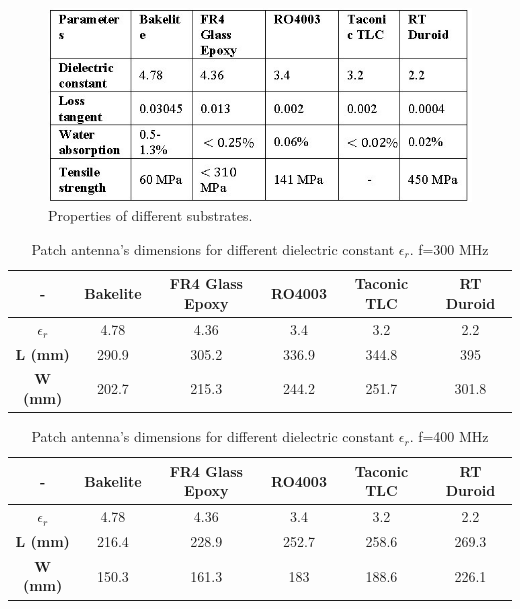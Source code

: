 \begin{figure}[ht]
\centering
\includegraphics[width=.75\textwidth]{figures/Yannis/substrate.jpg}
\caption{Properties of different substrates. \cite{substrates}}
\label{substrate}
\end{figure}

\begin{table}[ht]
\centering
\begin{tabular}[width=.75\textwidth]{| c | c | c | c | c | c |}
\hline
 - & \textbf{Bakelite} & \textbf{FR4 Glass Epoxy} & \textbf{RO4003} & \textbf{Taconic TLC} & \textbf{RT Duroid} \\ 
 \hline
 \textbf{$\epsilon_{r}$} & 4.78 & 4.36 & 3.4 & 3.2 & 2.2 \\  
 \hline
 \textbf{L (mm)} & 290.9 & 305.2 & 336.9 & 344.8 & 395 \\
 \hline
 \textbf{W (mm)} & 202.7 & 215.3 & 244.2 & 251.7 & 301.8 \\
 \hline
\end{tabular}
\caption{Patch antenna's dimensions for different dielectric constant $\epsilon_{r}$. f=300 MHz}
\label{table: subs300}
\end{table}

\begin{table}[ht]
\centering
\begin{tabular}[width=.75\textwidth]{| c | c | c | c | c | c |}
\hline
 - & \textbf{Bakelite} & \textbf{FR4 Glass Epoxy} & \textbf{RO4003} & \textbf{Taconic TLC} & \textbf{RT Duroid} \\ 
 \hline
 \textbf{$\epsilon_{r}$} & 4.78 & 4.36 & 3.4 & 3.2 & 2.2 \\  
 \hline
 \textbf{L (mm)} & 216.4 & 228.9 & 252.7 & 258.6 & 269.3 \\
 \hline
 \textbf{W (mm)} & 150.3 & 161.3 & 183 & 188.6 & 226.1 \\
 \hline
\end{tabular}
\caption{Patch antenna's dimensions for different dielectric constant $\epsilon_{r}$. f=400 MHz}
\label{table: subs400}
\end{table}

